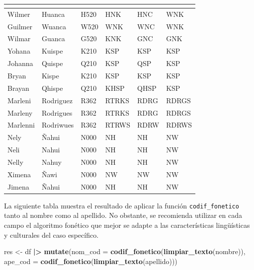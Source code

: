 \documentclass[
  12pt,
]{book}
\newenvironment{Shaded}{\begin{snugshade}}{\end{snugshade}}
\newcommand{\AttributeTok}[1]{\textcolor[rgb]{0.13,0.29,0.53}{#1}}
\newcommand{\FunctionTok}[1]{\textcolor[rgb]{0.13,0.29,0.53}{\textbf{#1}}}
\newcommand{\NormalTok}[1]{#1}
\newcommand{\OtherTok}[1]{\textcolor[rgb]{0.56,0.35,0.01}{#1}}
\newcommand{\SpecialCharTok}[1]{\textcolor[rgb]{0.81,0.36,0.00}{\textbf{#1}}}
\begin{document}
\begin{table}[t]
\fontsize{12.0pt}{14.4pt}\selectfont
\begin{tabular*}{\linewidth}{@{\extracolsep{\fill}}llllll}
\toprule
{\bfseries \cellcolor[HTML]{F9F9F9}{nombre}} & {\bfseries \cellcolor[HTML]{F9F9F9}{apellido}} & {\bfseries \cellcolor[HTML]{F9F9F9}{soundex}} & {\bfseries \cellcolor[HTML]{F9F9F9}{metaphone}} & {\bfseries \cellcolor[HTML]{F9F9F9}{statcan}} & {\bfseries \cellcolor[HTML]{F9F9F9}{latino}} \\ 
\midrule\addlinespace[2.5pt]
Wilmer & Huanca & H520 & HNK & HNC & WNK \\ 
Guilmer & Wuanca & W520 & WNK & WNC & WNK \\ 
Wilmar & Guanca & G520 & KNK & GNC & GNK \\ 
Yohana & Kuispe & K210 & KSP & KSP & KSP \\ 
Johanna & Quispe & Q210 & KSP & QSP & KSP \\ 
Bryan & Kispe & K210 & KSP & KSP & KSP \\ 
Brayan & Qhispe & Q210 & KHSP & QHSP & KSP \\ 
Marleni & Rodriguez & R362 & RTRKS & RDRG & RDRGS \\ 
Marleny & Rodrigues & R362 & RTRKS & RDRG & RDRGS \\ 
Marlenni & Rodriwues & R362 & RTRWS & RDRW & RDRWS \\ 
Nely & Ñahui & N000 & NH & NH & NW \\ 
Neli & Nahui & N000 & NH & NH & NW \\ 
Nelly & Nahuy & N000 & NH & NH & NW \\ 
Ximena & Ñawi & N000 & NW & NW & NW \\ 
Jimena & Ñahui & N000 & NH & NH & NW \\ 
\bottomrule
\end{tabular*}
\end{table}

La siguiente tabla muestra el resultado de aplicar la función \texttt{codif\_fonetico} tanto al nombre como al apellido. No obstante, se recomienda utilizar en cada campo el algoritmo fonético que mejor se adapte a las características lingüísticas y culturales del caso específico.

\begin{Shaded}
\begin{Highlighting}[]
\NormalTok{res }\OtherTok{\textless{}{-}}\NormalTok{ df }\SpecialCharTok{|\textgreater{}} 
         \FunctionTok{mutate}\NormalTok{(}\AttributeTok{nom\_cod =} \FunctionTok{codif\_fonetico}\NormalTok{(}\FunctionTok{limpiar\_texto}\NormalTok{(nombre)),}
                \AttributeTok{ape\_cod =} \FunctionTok{codif\_fonetico}\NormalTok{(}\FunctionTok{limpiar\_texto}\NormalTok{(apellido)))}
\end{Highlighting}
\end{Shaded}
\end{document}
